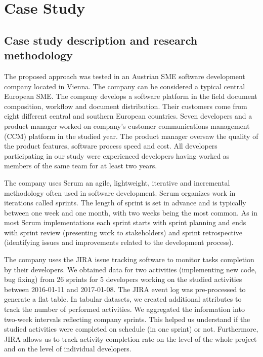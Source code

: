 \section{Case Study}

\subsection{Case study description and research methodology}
The proposed approach was tested in an Austrian SME software development company located in Vienna. The company can be considered a typical central European SME. The company develops a software platform in the field document composition, workflow and document distribution. Their customers come from eight different central and southern European countries. Seven developers and a product manager worked on company’s customer communications management (CCM) platform in the studied year. The product manager oversaw the quality of the product features, software process speed and cost. All developers participating in our study were experienced developers having worked as members of the same team for at least two years.

The company uses Scrum \citep{takeuchi1986new} an agile, lightweight, iterative and incremental methodology often used in software development. Scrum organizes work in iterations called sprints. The length of sprint is set in advance and is typically between one week and one month, with two weeks being the most common. As in most Scrum implementations each sprint starts with sprint planning and ends with sprint review (presenting work to stakeholders) and sprint retrospective (identifying issues and improvements related to the development process). 

The company uses the JIRA issue tracking software to monitor tasks completion by their developers. We obtained data for two activities (implementing new code, bug fixing) from 26 sprints for 5 developers working on the studied activities between 2016-01-11 and 2017-01-08. The JIRA event log was pre-processed to generate a flat table. In tabular datasets, we created additional attributes to track the number of performed activities. We aggregated the information into two-week intervals reflecting company sprints. This helped us understand if the studied activities were completed on schedule (in one sprint) or not. Furthermore, JIRA allows us to track activity completion rate on the level of the whole project and on the level of individual developers. 

